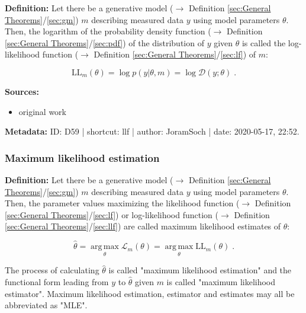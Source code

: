 \documentclass[a4paper,12pt,twoside]{book}
\begin{document}
\textbf{Definition:} Let there be a generative model ($\rightarrow$ Definition \ref{sec:General Theorems}/\ref{sec:gm}) $m$ describing measured data $y$ using model parameters $\theta$. Then, the logarithm of the probability density function ($\rightarrow$ Definition \ref{sec:General Theorems}/\ref{sec:pdf}) of the distribution of $y$ given $\theta$ is called the log-likelihood function ($\rightarrow$ Definition \ref{sec:General Theorems}/\ref{sec:lf}) of $m$:

\begin{equation} \label{eq:llf-llf}
\mathrm{LL}_m(\theta) = \log p(y|\theta,m) = \log \mathcal{D}(y; \theta) \; .
\end{equation}


\vspace{1em}
\textbf{Sources:}
\begin{itemize}
\item original work\end{itemize}


\vspace{1em}
\textbf{Metadata:} ID: D59 | shortcut: llf | author: JoramSoch | date: 2020-05-17, 22:52.
\vspace{1em}



\subsubsection[\textit{Maximum likelihood estimation}]{Maximum likelihood estimation} \label{sec:mle}
\setcounter{equation}{0}

\textbf{Definition:} Let there be a generative model ($\rightarrow$ Definition \ref{sec:General Theorems}/\ref{sec:gm}) $m$ describing measured data $y$ using model parameters $\theta$. Then, the parameter values maximizing the likelihood function ($\rightarrow$ Definition \ref{sec:General Theorems}/\ref{sec:lf}) or log-likelihood function ($\rightarrow$ Definition \ref{sec:General Theorems}/\ref{sec:llf}) are called maximum likelihood estimates of $\theta$:

\begin{equation} \label{eq:mle-mle}
\hat{\theta} = \operatorname*{arg\,max}_\theta \mathcal{L}_m(\theta) = \operatorname*{arg\,max}_\theta \mathrm{LL}_m(\theta) \; .
\end{equation}

The process of calculating $\hat{\theta}$ is called "maximum likelihood estimation" and the functional form leading from $y$ to $\hat{\theta}$ given $m$ is called "maximum likelihood estimator". Maximum likelihood estimation, estimator and estimates may all be abbreviated as "MLE".
\end{document}
